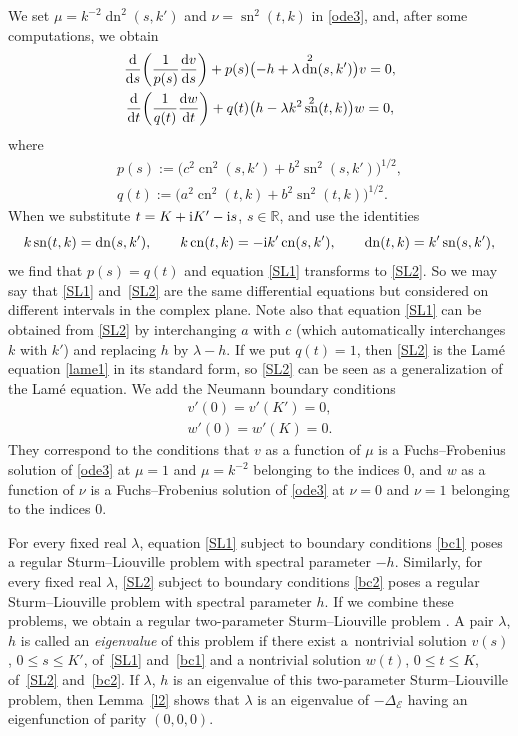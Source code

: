 \documentclass[pdftex]{sigma}
\newcommand{\R}{\mathbb{R}}
\newcommand{\E}{\mathcal{E}}
\newcommand{\D}{\Delta_\E}
\DeclareMathOperator{\sn}{sn}
\DeclareMathOperator{\cn}{cn}
\DeclareMathOperator{\dn}{dn}
\numberwithin{equation}{section}
\begin{document}
We set $\mu=k^{-2}\dn^2(s,k')$ and $\nu=\sn^2(t,k)$ in \eqref{ode3}, and, after some computations, we obtain
\begin{gather}\label{SL1}
\frac{{\rm d}}{{\rm d}s}\biggl(\frac{1}{p(s)}\frac{{\rm d}v}{{\rm d}s}\biggr)+p(s)\bigl(-h+\lambda \dn^2(s,k')\bigr) v=0,\\
\frac{{\rm d}}{{\rm d}t}\biggl(\frac{1}{q(t)}\frac{{\rm d}w}{{\rm d}t}\biggr)+q(t)\bigl(h-\lambda k^2\sn^2(t,k)\bigr)w=0, \label{SL2}
\end{gather}
where
\begin{gather}
 p(s) := \bigl(c^2\cn^2(s,k')+b^2\sn^2(s,k')\bigr)^{1/2},\label{p}\\
 q(t) := \bigl(a^2\cn^2(t,k)+b^2\sn^2(t,k)\bigr)^{1/2}\label{q}.
\end{gather}
When we substitute $t=K+ {\rm i}K'-{\rm i}s$, $s\in\R$, and use the identities
\[ k\sn(t,k)=\dn(s,k'),\qquad k\cn(t,k)=-{\rm i}k'\cn(s,k'),\qquad \dn(t,k)=k'\sn(s,k'),\]
we find that $p(s)=q(t)$ and equation \eqref{SL1} transforms to \eqref{SL2}.
So we may say that \eqref{SL1} and~\eqref{SL2} are the same differential equations but considered on different intervals
in the complex plane.
Note also that equation \eqref{SL1} can be obtained from \eqref{SL2} by interchanging $a$ with $c$ (which automatically
interchanges $k$ with $k'$) and replacing $h$ by $\lambda-h$.
If we put $q(t)=1$, then \eqref{SL2} is the Lam\'e equation \eqref{lame1} in its standard form, so \eqref{SL2} can be seen as a generalization of the Lam\'e equation.
We add the Neumann boundary conditions
\begin{gather}\label{bc1}
v'(0) = v'(K')=0, \\
w'(0) = w'(K)=0.\label{bc2}
\end{gather}
They
correspond to the conditions that $v$ as a function of $\mu$ is a Fuchs--Frobenius solution of \eqref{ode3} at $\mu=1$ and $\mu=k^{-2}$ belonging to the indices $0$, and $w$ as a function of $\nu$ is a Fuchs--Frobenius solution of \eqref{ode3}
at $\nu=0$ and $\nu=1$ belonging to the indices $0$.

For every fixed real $\lambda$, equation \eqref{SL1} subject to boundary conditions \eqref{bc1} poses
a regular Sturm--Liouville problem \cite[Section~27]{W} with spectral parameter $-h$.
Similarly, for every fixed real $\lambda$, \eqref{SL2} subject to boundary conditions \eqref{bc2} poses
a regular Sturm--Liouville problem with spectral parameter $h$.
If we combine these problems, we obtain a regular two-parameter Sturm--Liouville problem \cite{AM}.
A pair $\lambda$, $h$ is called an
{\it eigenvalue} of this problem if there exist a~nontrivial solution $v(s)$, $0\le s\le K'$, of~\eqref{SL1} and~\eqref{bc1}
and a nontrivial solution $w(t)$, $0\le t\le K$, of~\eqref{SL2} and~\eqref{bc2}.
If $\lambda$, $h$ is an eigenvalue of this two-parameter Sturm--Liouville problem, then Lemma~\ref{l2}
shows that $\lambda$ is an eigenvalue of $-\D$ having an eigenfunction of parity $(0,0,0)$.
\end{document}
